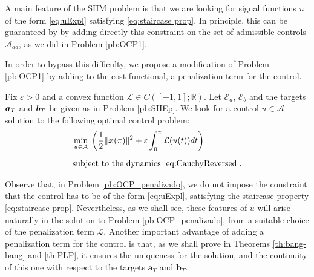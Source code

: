 \documentclass[9pt,shortpaper,twoside,web]{ieeecolor}
\begin{document}
A main feature of the SHM problem is that we are looking for signal functions $u$ of the form \eqref{eq:uExpl} satisfying \eqref{eq:staircase prop}. In principle, this can be guaranteed by by adding directly this constraint on the set of admissible controls $\mathcal{A}_{ad}$, as we did in Problem \ref{pb:OCP1}.
 
In order to bypass this difficulty, we propose a modification of Problem \ref{pb:OCP1} by adding to the cost functional, a penalization term for the control. 

\begin{problem}\label{pb:OCP_penalizado}
	Fix $\varepsilon>0$ and a convex function $\mathcal{L}\in C([-1,1];\mathbb{R})$.  Let $\mathcal{E}_a$, $\mathcal{E}_b$ and the targets $\bm{a}_T$ and $\bm{b}_T$ be given as in Problem \ref{pb:SHEp}. We look for a control $u\in \mathcal A$ solution to the following optimal control problem:
	\begin{align*}
		&\displaystyle\min_{u \in \mathcal A}\;\left(\dfrac{1}{2} \|\bm{x}(\pi)\|^2 + \varepsilon \displaystyle\int_0^\pi \mathcal{L}(u(t)) dt\right) 
		\\[5pt] 
		&\text{subject to the dynamics \eqref{eq:CauchyReversed}}.
	\end{align*}
\end{problem}
 
Observe that, in Problem \ref{pb:OCP_penalizado}, we do not impose the constraint that the control has to be of the form \eqref{eq:uExpl}, satisfying the staircase property \eqref{eq:staircase prop}. Nevertheless, as we shall see, these features of $u$ will arise naturally in the solution to Problem \ref{pb:OCP_penalizado}, from a suitable choice of the penalization term $\mathcal{L}$.
Another important advantage of adding a penalization term for the control is that, as we shall prove in Theorems \ref{th:bang-bang} and \ref{th:PLP}, it ensures the uniqueness for the solution, and the continuity of this one with respect to the targets $\bm{a}_T$ and $\bm{b}_T$.
\end{document}
